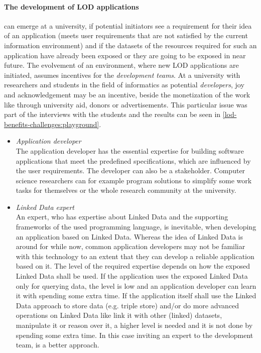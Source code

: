\documentclass{article}
\begin{document}
\paragraph{The development of LOD applications}
\label{technical-architecture-challenges:lod-effort:dev-app}
can emerge at a university, if potential initiators see a requirement for their idea of an application (meets user requirements that are not satisfied by the current information environment) and if the datasets of the resources required for such an application have already been exposed or they are going to be exposed in near future. The evolvement of an environment, where new LOD applications are initiated, assumes incentives for the \textit{development teams}. At a university with researchers and students in the field of informatics as potential \textit{developers}, joy and acknowledgement may be an incentive, beside the monetization
of the work like through university aid, donors or advertisements. This particular issue was part of the interviews with the students and the results can be seen in \ref{lod-benefits-challenges:playground}.

\begin{itemize}
\item \textit{Application developer}~\\
The application developer has the essential expertise for building software applications that meet the predefined specifications, which are influenced by the user requirements. The developer can also be a stakeholder. Computer science researchers can for example program solutions to simplify some work tasks for themselves or the whole research community at the university. 

\item \textit{Linked Data expert}~\\
An expert, who has expertise about Linked Data and the supporting frameworks of the used programming language, is inevitable, when developing an application based on Linked Data. Whereas the idea of Linked Data is around for while now, common application developers may not be familiar with this technology to an extent that they can develop a reliable application based on it. The level of the required expertise depends on how the exposed Linked Data shall be used. If the application uses the exposed Linked Data only for querying data, the level is low and an application developer can learn it with spending some extra time. If the application itself shall use the Linked Data approach to store data (e.g. triple store) and/or do more advanced operations on Linked Data like link it with other (linked) datasets, manipulate it or reason over it, a higher level is needed and it is not done by spending some extra time. In this case inviting an expert to the development team, is a better approach.
\end{itemize}
\end{document}
